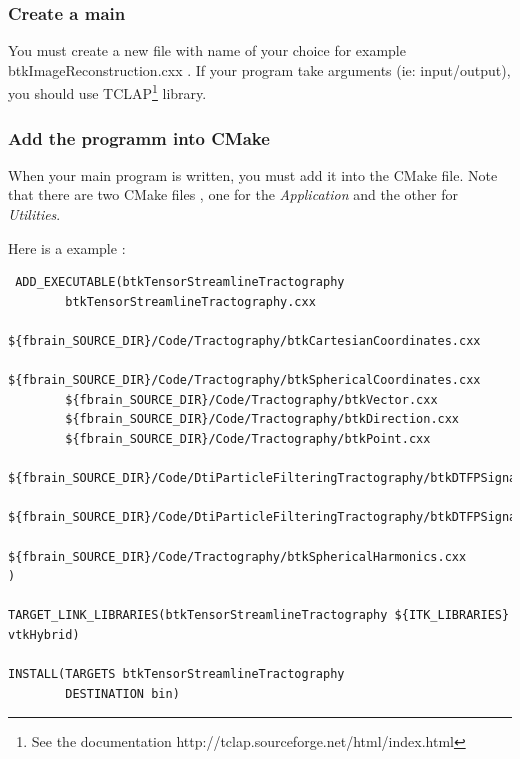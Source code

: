 \subsubsection{Create a main}
You must create a new file with name of your choice for example btkImageReconstruction.cxx .
If your program take arguments (ie: input/output), you should use TCLAP\footnote{See the documentation http://tclap.sourceforge.net/html/index.html } library.
\subsubsection{Add the programm into CMake}
When your main program is written, you must add it into the CMake file.
Note that there are two CMake files , one for the \textit{Application} and the other for \textit{Utilities}.

Here is a example :
\begin{verbatim}
 ADD_EXECUTABLE(btkTensorStreamlineTractography
        btkTensorStreamlineTractography.cxx
        ${fbrain_SOURCE_DIR}/Code/Tractography/btkCartesianCoordinates.cxx
        ${fbrain_SOURCE_DIR}/Code/Tractography/btkSphericalCoordinates.cxx
        ${fbrain_SOURCE_DIR}/Code/Tractography/btkVector.cxx
        ${fbrain_SOURCE_DIR}/Code/Tractography/btkDirection.cxx
        ${fbrain_SOURCE_DIR}/Code/Tractography/btkPoint.cxx
        ${fbrain_SOURCE_DIR}/Code/DtiParticleFilteringTractography/btkDTFPSignalExtractor.cxx
        ${fbrain_SOURCE_DIR}/Code/DtiParticleFilteringTractography/btkDTFPSignal.cxx
        ${fbrain_SOURCE_DIR}/Code/Tractography/btkSphericalHarmonics.cxx
)

TARGET_LINK_LIBRARIES(btkTensorStreamlineTractography ${ITK_LIBRARIES} vtkHybrid)

INSTALL(TARGETS btkTensorStreamlineTractography
        DESTINATION bin)
\end{verbatim}


